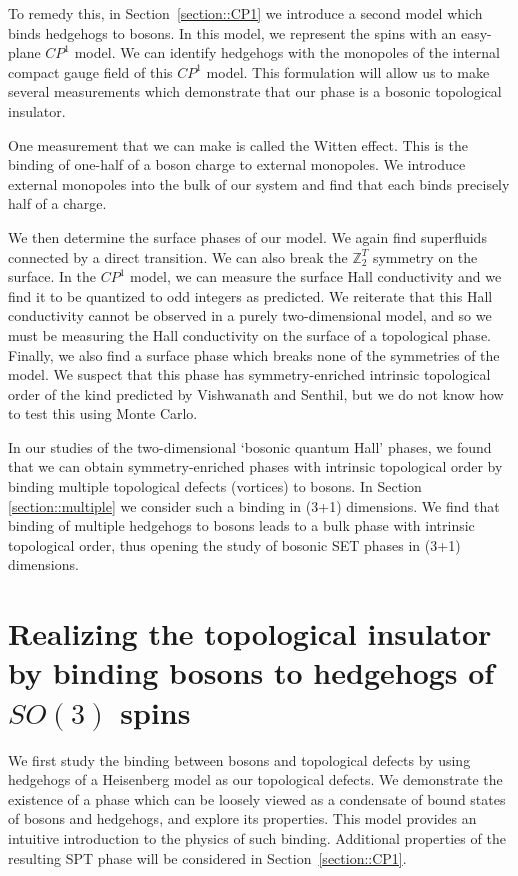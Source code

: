 \documentclass[prb,twocolumn]{revtex4-1}
\def\ztwot{\mathbb{Z}_2^T}
\newcommand{\cp}{$CP^1$ }
\begin{document}
To remedy this, in Section~\ref{section::CP1} we introduce a second model which binds hedgehogs to bosons. In this model, we represent the spins with an easy-plane \cp model. We can identify hedgehogs with the monopoles of the internal compact gauge field of this \cp model. This formulation will allow us to make several measurements which demonstrate that our phase is a bosonic topological insulator.

One measurement that we can make is called the Witten effect.\cite{MaxWitten,Max} This is the binding of one-half of a boson charge to external monopoles. We introduce external monopoles into the bulk of our system and find that each binds precisely half of a charge.

We then determine the surface phases of our model. We again find superfluids connected by a direct transition.  We can also break the $\ztwot$ symmetry on the surface. In the \cp model, we can measure the surface Hall conductivity and we find it to be quantized to odd integers as predicted. We reiterate that this Hall conductivity cannot be observed in a purely two-dimensional model, and so we must be measuring the Hall conductivity on the surface of a topological phase. Finally, we also find a surface phase which breaks none of the symmetries of the model. We suspect that this phase has symmetry-enriched intrinsic topological order of the kind predicted by Vishwanath and Senthil,\cite{SenthilVishwanath} but we do not know how to test this using Monte Carlo.

In our studies of the two-dimensional `bosonic quantum Hall' phases,\cite{FQHE} we found that we can obtain symmetry-enriched phases with intrinsic topological order by binding multiple topological defects (vortices) to bosons. In Section \ref{section::multiple} we consider such a binding in (3+1) dimensions. We find that binding of multiple hedgehogs to bosons leads to a bulk phase with intrinsic topological order, thus opening the study of bosonic SET phases in (3+1) dimensions.

\section{Realizing the topological insulator by binding bosons to hedgehogs of $SO(3)$ spins}
\label{section::Heisenberg}

We first study the binding between bosons and topological defects by using hedgehogs of a Heisenberg model as our topological defects. We demonstrate the existence of a phase which can be loosely viewed as a condensate of bound states of bosons and hedgehogs, and explore its properties. This model provides an intuitive introduction to the physics of such binding. Additional properties of the resulting SPT phase will be considered in Section~\ref{section::CP1}.
\end{document}
